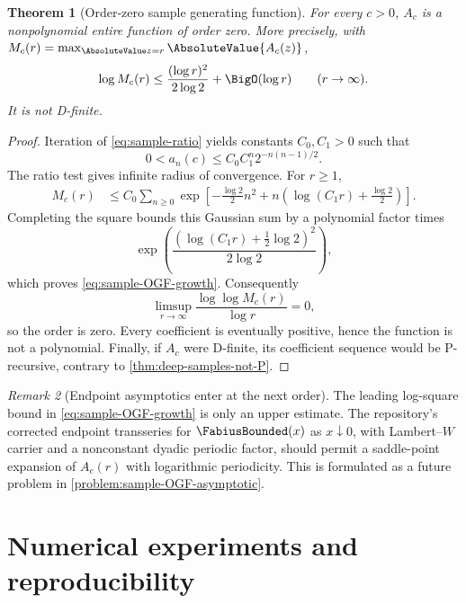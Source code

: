 \documentclass[11pt]{article}
\numberwithin{equation}{section}
\newtheorem{theorem}{Theorem}[section]
\theoremstyle{definition}
\theoremstyle{remark}
\newtheorem{remark}[theorem]{Remark}
\begin{document}
\begin{theorem}[Order-zero sample generating function]
\label{thm:sample-OGF-order-zero}
For every $c>0$, $A_c$ is a nonpolynomial entire function of order zero.  More
precisely, with
$M_c(r)=\max_{\AbsoluteValue z=r}\AbsoluteValue{A_c(z)}$,
\begin{equation}
 \log M_c(r)
 \le\frac{(\log r)^2}{2\log2}+\BigO(\log r)
 \qquad(r\to\infty).
 \label{eq:sample-OGF-growth}
\end{equation}
It is not D-finite.
\end{theorem}
\begin{proof}
Iteration of \eqref{eq:sample-ratio} yields constants $C_0,C_1>0$ such that
\begin{equation}
 0<a_n(c)\le C_0C_1^n2^{-n(n-1)/2}.
 \label{eq:sample-coefficient-upper}
\end{equation}
The ratio test gives infinite radius of convergence.  For $r\ge1$,
\begin{align*}
 M_c(r)
 &\le C_0\sum_{n\ge0}
 \exp\left[-\frac{\log2}{2}n^2
 +n\left(\log(C_1r)+\frac{\log2}{2}\right)\right].
\end{align*}
Completing the square bounds this Gaussian sum by a polynomial factor times
\[
 \exp\left(
 \frac{(\log(C_1r)+\frac12\log2)^2}{2\log2}
 \right),
\]
which proves \eqref{eq:sample-OGF-growth}.  Consequently
\[
 \limsup_{r\to\infty}
 \frac{\log\log M_c(r)}{\log r}=0,
\]
so the order is zero.  Every coefficient is eventually positive, hence the
function is not a polynomial.  Finally, if $A_c$ were D-finite, its coefficient
sequence would be P-recursive, contrary to
\cref{thm:deep-samples-not-P}.
\end{proof}

\begin{remark}[Endpoint asymptotics enter at the next order]
The leading log-square bound in \eqref{eq:sample-OGF-growth} is only an upper
estimate.  The repository's corrected endpoint transseries for $\FabiusBounded(x)$ as
$x\downarrow0$, with Lambert--$W$ carrier and a nonconstant dyadic periodic
factor, should permit a saddle-point expansion of $A_c(r)$ with logarithmic
periodicity.  This is formulated as a future problem in
\cref{problem:sample-OGF-asymptotic}.
\end{remark}

\section{Numerical experiments and reproducibility}
\label{sec:numerics}
\end{document}
